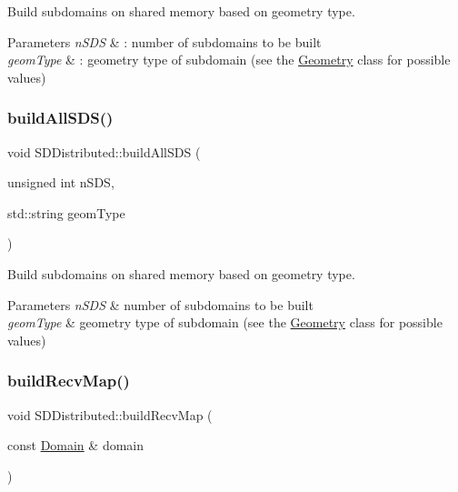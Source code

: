 Build subdomains on shared memory based on geometry type. 


\begin{DoxyParams}{Parameters}
{\em n\+S\+DS} & \+: number of subdomains to be built \\
\hline
{\em geom\+Type} & \+: geometry type of subdomain (see the \hyperlink{classGeometry}{Geometry} class for possible values) \\
\hline
\end{DoxyParams}
\mbox{\label{classSDDistributed_a3dbacea02c2d4f36310c81f87f90fe5a}} 
\subsubsection{\texorpdfstring{build\+All\+S\+D\+S()}{buildAllSDS()}\hspace{0.1cm}{\footnotesize\ttfamily [2/2]}}
{\footnotesize\ttfamily void S\+D\+Distributed\+::build\+All\+S\+DS (\begin{DoxyParamCaption}\item[{unsigned int}]{n\+S\+DS,  }\item[{std\+::string}]{geom\+Type }\end{DoxyParamCaption})}



Build subdomains on shared memory based on geometry type. 


\begin{DoxyParams}{Parameters}
{\em n\+S\+DS} & number of subdomains to be built \\
\hline
{\em geom\+Type} & geometry type of subdomain (see the \hyperlink{classGeometry}{Geometry} class for possible values) \\
\hline
\end{DoxyParams}
\mbox{\label{classSDDistributed_af819b64d742bec7dee4fd0fab43aa6e5}} 
\subsubsection{\texorpdfstring{build\+Recv\+Map()}{buildRecvMap()}}
{\footnotesize\ttfamily void S\+D\+Distributed\+::build\+Recv\+Map (\begin{DoxyParamCaption}\item[{const \hyperlink{classDomain}{Domain} \&}]{domain }\end{DoxyParamCaption})}



